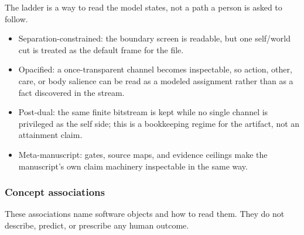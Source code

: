 \documentclass[
]{article}
\providecommand{\tightlist}{%
  \setlength{\itemsep}{0pt}\setlength{\parskip}{0pt}}
\begin{document}
The ladder is a way to read the model states, not a path a person is
asked to follow.

\begin{itemize}
\tightlist
\item
  Separation-constrained: the boundary screen is readable, but one
  self/world cut is treated as the default frame for the file.
\item
  Opacified: a once-transparent channel becomes inspectable, so action,
  other, care, or body salience can be read as a modeled assignment
  rather than as a fact discovered in the stream.
\item
  Post-dual: the same finite bitstream is kept while no single channel
  is privileged as the self side; this is a bookkeeping regime for the
  artifact, not an attainment claim.
\item
  Meta-manuscript: gates, source maps, and evidence ceilings make the
  manuscript's own claim machinery inspectable in the same way.
\end{itemize}

\subsubsection{Concept associations}\label{concept-associations}

These associations name software objects and how to read them. They do
not describe, predict, or prescribe any human outcome.
\end{document}
